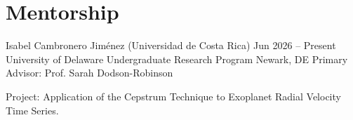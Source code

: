 \section{Mentorship}

\resumeExpEntry
    {Isabel Cambronero Jiménez (Universidad de Costa Rica)}
    {Jun 2026 – Present}
    {University of Delaware Undergraduate Research Program}
    {Newark, DE}
    {Primary Advisor: Prof. Sarah Dodson-Robinson}
    {
        \item Project: Application of the Cepstrum Technique to Exoplanet Radial Velocity Time Series.
    }
